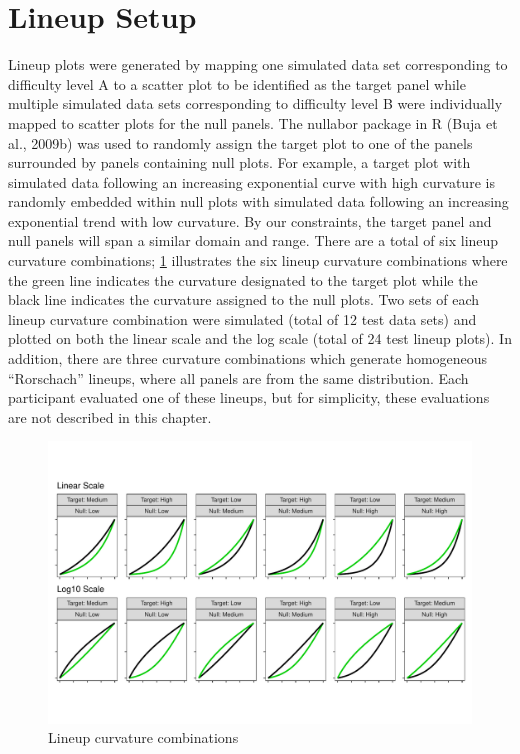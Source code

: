 \documentclass[print]{nuthesis}
\begin{document}
\hypertarget{lineup-setup}{%
\section{Lineup Setup}\label{lineup-setup}}

Lineup plots were generated by mapping one simulated data set corresponding to difficulty level A to a scatter plot to be identified as the target panel while multiple simulated data sets corresponding to difficulty level B were individually mapped to scatter plots for the null panels.
The nullabor package in R (Buja et al., 2009b) was used to randomly assign the target plot to one of the panels surrounded by panels containing null plots.
For example, a target plot with simulated data following an increasing exponential curve with high curvature is randomly embedded within null plots with simulated data following an increasing exponential trend with low curvature.
By our constraints, the target panel and null panels will span a similar domain and range.
There are a total of six lineup curvature combinations; \cref{fig:curvature-combination-example} illustrates the six lineup curvature combinations where the green line indicates the curvature designated to the target plot while the black line indicates the curvature assigned to the null plots.
Two sets of each lineup curvature combination were simulated (total of 12 test data sets) and plotted on both the linear scale and the log scale (total of 24 test lineup plots).
In addition, there are three curvature combinations which generate homogeneous ``Rorschach'' lineups, where all panels are from the same distribution.
Each participant evaluated one of these lineups, but for simplicity, these evaluations are not described in this chapter.

\begin{figure}[tbp]

{\centering \includegraphics[width=0.75\linewidth,]{thesis_files/figure-latex/curvature-combination-example-1} 

}

\caption{Lineup curvature combinations}\label{fig:curvature-combination-example}
\end{figure}
\end{document}
